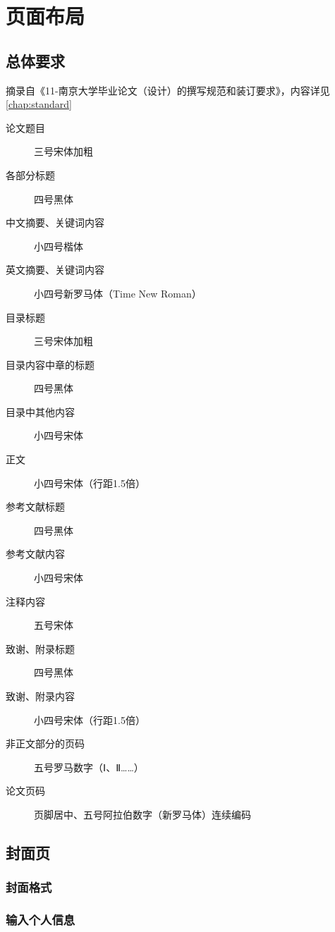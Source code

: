 \chapter{页面布局}

\section{总体要求}

摘录自《11-南京大学毕业论文（设计）的撰写规范和装订要求》，内容详见\cref{chap:standard}

\begin{description}
    \item[论文题目] 三号宋体加粗
    \item[各部分标题] 四号黑体
    \item[中文摘要、关键词内容] 小四号楷体
    \item[英文摘要、关键词内容] 小四号新罗马体（Time New Roman）
    \item[目录标题] 三号宋体加粗
    \item[目录内容中章的标题] 四号黑体
    \item[目录中其他内容] 小四号宋体
    \item[正文] 小四号宋体（行距1.5倍）
    \item[参考文献标题] 四号黑体
    \item[参考文献内容] 小四号宋体
    \item[注释内容] 五号宋体
    \item[致谢、附录标题] 四号黑体
    \item[致谢、附录内容] 小四号宋体（行距1.5倍）
    \item[非正文部分的页码] 五号罗马数字（Ⅰ、Ⅱ……）
    \item[论文页码] 页脚居中、五号阿拉伯数字（新罗马体）连续编码
\end{description}

\section{封面页}

\subsection{封面格式}

\subsection{输入个人信息}

